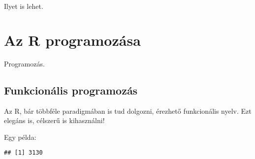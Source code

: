 \documentclass[]{book}
\newenvironment{Shaded}{\begin{snugshade}}{\end{snugshade}}
\newcommand{\ControlFlowTok}[1]{\textcolor[rgb]{0.13,0.29,0.53}{\textbf{#1}}}
\newcommand{\DecValTok}[1]{\textcolor[rgb]{0.00,0.00,0.81}{#1}}
\newcommand{\KeywordTok}[1]{\textcolor[rgb]{0.13,0.29,0.53}{\textbf{#1}}}
\newcommand{\NormalTok}[1]{#1}
\newcommand{\OperatorTok}[1]{\textcolor[rgb]{0.81,0.36,0.00}{\textbf{#1}}}
\newcommand{\StringTok}[1]{\textcolor[rgb]{0.31,0.60,0.02}{#1}}
\begin{document}
Ilyet is lehet.

\hypertarget{az-r-programozuxe1sa}{%
\chapter{Az R programozása}\label{az-r-programozuxe1sa}}

Programozás.

\hypertarget{funkcionuxe1lis-programozuxe1s}{%
\section{Funkcionális programozás}\label{funkcionuxe1lis-programozuxe1s}}

Az R, bár többféle paradigmában is tud dolgozni, érezhető funkcionális nyelv. Ezt elegáns is, célszerű is kihasználni!

Egy példa:

\begin{Shaded}
\end{Shaded}

\begin{verbatim}
## [1] 3130
\end{verbatim}

\begin{Shaded}
\end{Shaded}
\end{document}
